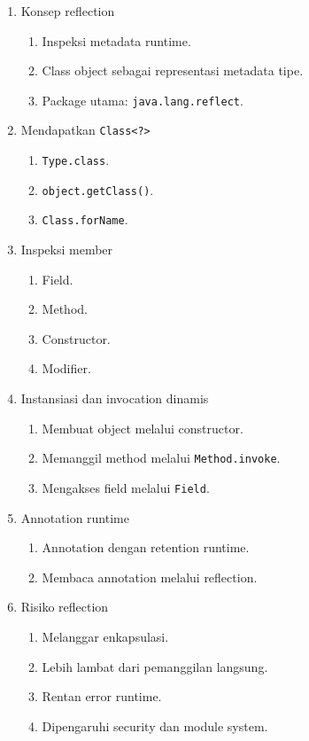 \begin{enumerate}
    \item Konsep reflection
    \begin{enumerate}
        \item Inspeksi metadata runtime.
        \item Class object sebagai representasi metadata tipe.
        \item Package utama: \texttt{java.lang.reflect}.
    \end{enumerate}
    \item Mendapatkan \texttt{Class<?>}
    \begin{enumerate}
        \item \texttt{Type.class}.
        \item \texttt{object.getClass()}.
        \item \texttt{Class.forName}.
    \end{enumerate}
    \item Inspeksi member
    \begin{enumerate}
        \item Field.
        \item Method.
        \item Constructor.
        \item Modifier.
    \end{enumerate}
    \item Instansiasi dan invocation dinamis
    \begin{enumerate}
        \item Membuat object melalui constructor.
        \item Memanggil method melalui \texttt{Method.invoke}.
        \item Mengakses field melalui \texttt{Field}.
    \end{enumerate}
    \item Annotation runtime
    \begin{enumerate}
        \item Annotation dengan retention runtime.
        \item Membaca annotation melalui reflection.
    \end{enumerate}
    \item Risiko reflection
    \begin{enumerate}
        \item Melanggar enkapsulasi.
        \item Lebih lambat dari pemanggilan langsung.
        \item Rentan error runtime.
        \item Dipengaruhi security dan module system.
    \end{enumerate}
\end{enumerate}

